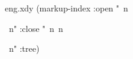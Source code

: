  
 
 
\begin{filecontents*}{eng.xdy}
(markup-index :open  "~n
\begin{theindex}
  \providecommand*\lettergroupDefault[1]{}
  \providecommand*\lettergroup[1]{%
    \textit{#1}
    \nopagebreak
  }
  ~n"
  :close "~n~n\end{theindex}~n"
:tree)
\end{filecontents*}

